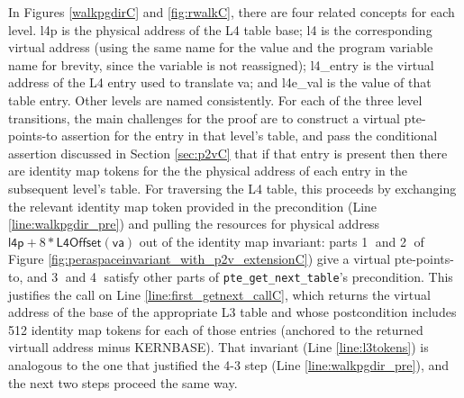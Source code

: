 In Figures \ref{walkpgdirC} and \ref{fig:rwalkC}, there are four related concepts for each level.
\textsf{l4p} is the physical address of the L4 table base; \textsf{l4} is the corresponding virtual address
(using the same name for the value and the program variable name for brevity, since the variable is not reassigned);
\textsf{l4\_entry} is the virtual address of the L4 entry used to translate \textsf{va};
and \textsf{l4e\_val} is the value of that table entry.
Other levels are named consistently.
For each of the three level transitions, the main challenges for the proof are to
construct a virtual pte-points-to assertion for the entry in that level's table,
and pass the conditional assertion discussed in Section \ref{sec:p2vC} that if that entry is present then there are
identity map tokens for the the physical address of each entry in the subsequent level's table.
For traversing the L4 table, this proceeds by
exchanging the relevant identity map token provided in the precondition (Line \ref{line:walkpgdir_pre})
and pulling the resources for physical address $\mathsf{l4p}+8*\textsf{L4Offset}(\textsf{va})$
out of the identity map invariant: 
parts \textcircled{1} and \textcircled{2} of Figure \ref{fig:peraspaceinvariant_with_p2v_extensionC}) give a virtual pte-points-to,
and \textcircled{3} and \textcircled{4} satisfy other parts of \lstinline|pte_get_next_table|'s precondition.
This justifies the call on Line \ref{line:first_getnext_callC},
which returns the virtual address of the base of the appropriate L3 table and whose postcondition
includes 512 identity map tokens for each of those entries (anchored to the returned virtuall address minus \textsf{KERNBASE}).
That invariant (Line \ref{line:l3tokens}) is analogous to the one that justified the 4-3 step (Line \ref{line:walkpgdir_pre}), and the next two steps proceed the same way.

